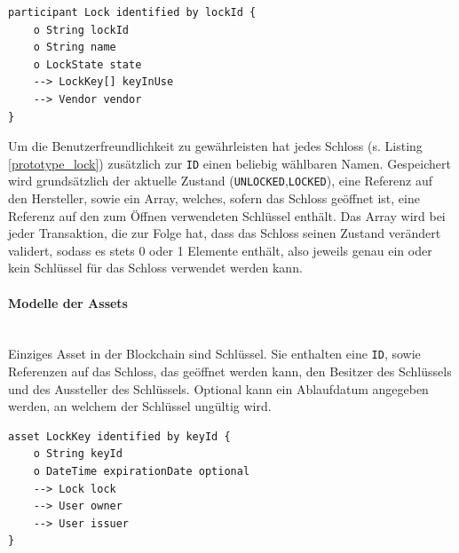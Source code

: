             \medskip
            \begin{lstlisting}[caption={Repräsantation eines Schlosses},label=prototype_lock,captionpos=b]
participant Lock identified by lockId {
    o String lockId
    o String name
    o LockState state
    --> LockKey[] keyInUse
    --> Vendor vendor
}
            \end{lstlisting}
            Um die Benutzerfreundlichkeit zu gewährleisten hat jedes Schloss (s. Listing \ref{prototype_lock}) zusätzlich zur \colorbox{light-gray}{\lstinline{ID}} einen beliebig wählbaren Namen. 
            Gespeichert wird grundsätzlich der aktuelle Zustand (\colorbox{light-gray}{\lstinline{UNLOCKED}},\colorbox{light-gray}{\lstinline{LOCKED}}), eine Referenz auf den Hersteller, sowie ein Array, welches, sofern das Schloss geöffnet ist, eine Referenz auf den zum Öffnen verwendeten Schlüssel enthält. 
            Das Array wird bei jeder Transaktion, die zur Folge hat, dass das Schloss seinen Zustand verändert  validert, sodass es stets 0 oder 1 Elemente enthält, also jeweils genau ein oder kein Schlüssel für das Schloss verwendet werden kann.
            
        \paragraph{\textrm{Modelle der Assets}}\hspace{0cm}\\
            Einziges Asset in der Blockchain sind Schlüssel. 
            Sie enthalten eine \colorbox{light-gray}{\lstinline{ID}}, sowie Referenzen auf das Schloss, das geöffnet werden kann, den Besitzer des Schlüssels und des Aussteller des Schlüssels. 
            Optional kann ein Ablaufdatum angegeben werden, an welchem der Schlüssel ungültig wird.
            \medskip
            \begin{lstlisting}[caption={Repräsantation eines Schlüssels},label=prototype_key,captionpos=b]
asset LockKey identified by keyId {
    o String keyId
    o DateTime expirationDate optional
    --> Lock lock
    --> User owner
    --> User issuer
}
            \end{lstlisting}
        
